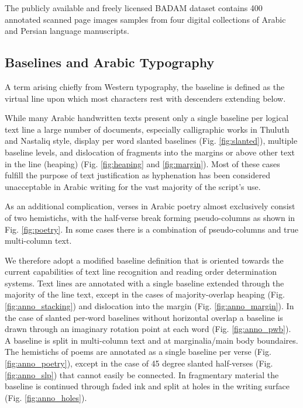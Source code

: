 The publicly available and freely licensed BADAM dataset contains 400 annotated
scanned page images samples from four digital collections of Arabic and Persian
language manuscripts.

\subsection{Baselines and Arabic Typography}

A term arising chiefly from Western typography, the baseline is defined as the
virtual line upon which most characters rest with descenders extending below.

While many Arabic handwritten texts present only a single baseline per logical
text line a large number of documents, especially calligraphic works in Thuluth
and Nastaliq style, display per word slanted baselines (Fig.
\ref{fig:slanted}), multiple baseline levels, and dislocation of fragments into
the margins or above other text in the line (heaping) (Fig. \ref{fig:heaping}
and \ref{fig:margin}). Most of these cases fulfill the purpose of text
justification as hyphenation has been considered unacceptable in Arabic writing
for the vast majority of the script's use.

As an additional complication, verses in Arabic poetry almost exclusively
consist of two hemistichs, with the half-verse break forming pseudo-columns as
shown in Fig. \ref{fig:poetry}. In some cases there is a combination of
pseudo-columns and true multi-column text.

We therefore adopt a modified baseline definition that is oriented towards the
current capabilities of text line recognition and reading order determination
systems. Text lines are annotated with a single baseline extended through the
majority of the line text, except in the cases of majority-overlap heaping
(Fig. \ref{fig:anno_stacking}) and dislocation into the margin (Fig. \ref{fig:anno_margin}).
In the case of slanted per-word baselines without horizontal overlap a baseline
is drawn through an imaginary rotation point at each word (Fig. \ref{fig:anno_pwb}). A
baseline is split in multi-column text and at marginalia/main body boundaires.
The hemistichs of poems are annotated as a single baseline per verse
(Fig. \ref{fig:anno_poetry}), except in the case of 45 degree slanted half-verses
(Fig. \ref{fig:anno_slp}) that cannot easily be connected. In fragmentary material the
baseline is continued through faded ink and split at holes in the writing
surface (Fig. \ref{fig:anno_holes}).

